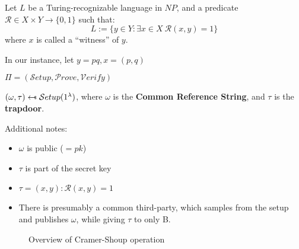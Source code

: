Let $L$ be a Turing-recognizable language in $NP$, and a predicate $\mathcal{R} \in X \times Y \to \{0, 1\}$ such that:
\begin{equation*}
    L := \{y \in Y : \exists x \in X \: \mathcal{R}(x, y) = 1\}
\end{equation*}
where $x$ is called a ``witness'' of $y$.

In our instance, let $y = pq, x = (p,q)$

$\Pi = (\mathcal{S}etup, \mathcal{P}rove, \mathcal{V}erify)$

$(\omega, \tau) \pickUAR \mathcal{S}etup(1^\lambda)$, where $\omega$ is the \textbf{Common Reference String}, and $\tau$ is the \textbf{trapdoor}.

Additional notes:
\begin{itemize}
    \item $\omega$ is public ($ = pk$)
    \item $\tau$ is part of the secret key
    \item $\tau = (x, y) : \mathcal{R}(x, y) = 1$ %
    \item There is presumably a common third-party, which samples from the setup and publishes $\omega$, while giving $\tau$ to only B. %
\end{itemize}


\begin{figure}[h!]
    \centering
    \sdinit{}
    \caption{Overview of Cramer-Shoup operation}
    \label{seq:csoverview}
\end{figure}

